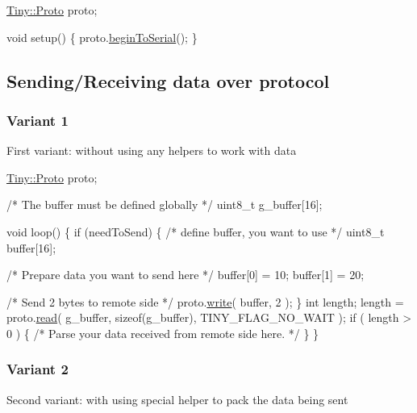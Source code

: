 \begin{DoxyCode}
\hyperlink{classTiny_1_1Proto}{Tiny::Proto} proto;

\textcolor{keywordtype}{void} setup()
\{
    proto.\hyperlink{classTiny_1_1Proto_a1dcad822337b6155148b1da9222fdd82}{beginToSerial}();
\}
\end{DoxyCode}
\hypertarget{arduino_arduino_tiny_send}{}\subsection{Sending/\+Receiving data over protocol}\label{arduino_arduino_tiny_send}
\hypertarget{arduino_arduino_tiny_send_receive1}{}\subsubsection{Variant 1}\label{arduino_arduino_tiny_send_receive1}
First variant\+: without using any helpers to work with data 
\begin{DoxyCode}
\hyperlink{classTiny_1_1Proto}{Tiny::Proto} proto;

\textcolor{comment}{/* The buffer must be defined globally */}
uint8\_t g\_buffer[16];

\textcolor{keywordtype}{void} loop()
\{
    \textcolor{keywordflow}{if} (needToSend)
    \{
        \textcolor{comment}{/* define buffer, you want to use */}
        uint8\_t buffer[16];

        \textcolor{comment}{/* Prepare data you want to send here */}
        buffer[0] = 10;
        buffer[1] = 20;

        \textcolor{comment}{/* Send 2 bytes to remote side */}
        proto.\hyperlink{classTiny_1_1Proto_a46fbc8b8681431b9b0a9a4b953a8dc33}{write}( buffer, 2 );
    \}
    \textcolor{keywordtype}{int} length;
    length = proto.\hyperlink{classTiny_1_1Proto_acc00ac10509eaa11a83b0b88a2278b3e}{read}( g\_buffer, \textcolor{keyword}{sizeof}(g\_buffer), TINY\_FLAG\_NO\_WAIT );
    \textcolor{keywordflow}{if} ( length > 0 )
    \{
        \textcolor{comment}{/* Parse your data received from remote side here. */}
    \}
\}
\end{DoxyCode}
\hypertarget{arduino_arduino_tiny_send_receive2}{}\subsubsection{Variant 2}\label{arduino_arduino_tiny_send_receive2}
Second variant\+: with using special helper to pack the data being sent 
